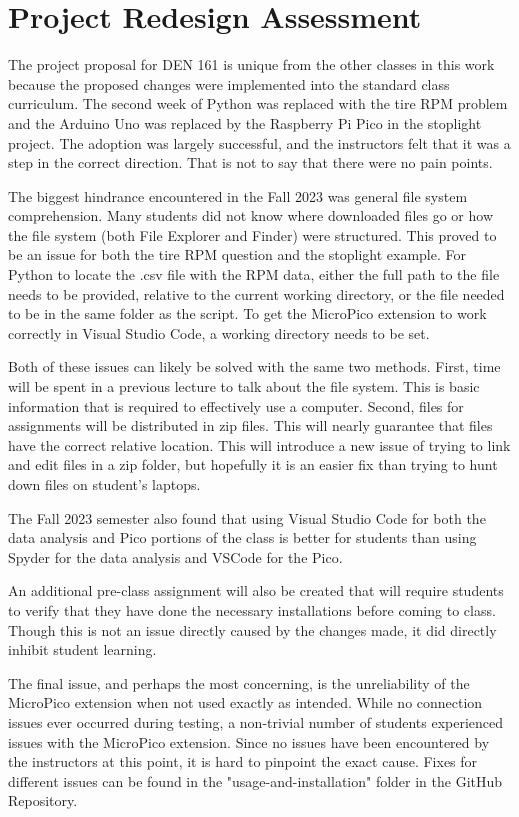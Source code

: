 \section{Project Redesign Assessment}

The project proposal for DEN 161 is unique from the other classes in this work because the proposed changes were
implemented into the standard class curriculum. The second week of Python was replaced with the tire RPM problem
and the Arduino Uno was replaced by the Raspberry Pi Pico in the stoplight project. The adoption was largely 
successful, and the instructors felt that it was a step in the correct direction. That is not to say that there
were no pain points.

The biggest hindrance encountered in the Fall 2023 was general file system comprehension. Many students did not 
know where downloaded files go or how the file system (both File Explorer and Finder) were structured. This proved 
to be an issue for both the tire RPM question and the stoplight example. For Python to locate the .csv file 
with the RPM data, either the full path to the file needs to be provided, relative to the current working directory,
or the file needed to be in the same folder as the script. To get the MicroPico extension to work correctly in
Visual Studio Code, a working directory needs to be set. 

Both of these issues can likely be solved with the same two methods. First, time will be spent in a previous lecture
to talk about the file system. This is basic information that is required to effectively use a computer. Second,
files for assignments will be distributed in zip files. This will nearly guarantee that files have the correct
relative location. This will introduce a new issue of trying to link and edit files in a zip folder, but hopefully
it is an easier fix than trying to hunt down files on student's laptops.

The Fall 2023 semester also found that using Visual Studio Code for both the data analysis and Pico portions of the
class is better for students than using Spyder for the data analysis and VSCode for the Pico. 

An additional pre-class assignment will also be created that will require students to verify that they have
done the necessary installations before coming to class. Though this is not an issue directly caused by the changes
made, it did directly inhibit student learning.

The final issue, and perhaps the most concerning, is the unreliability of the MicroPico extension when not used 
exactly as intended. While no connection issues ever occurred during testing, a non-trivial number of students
experienced issues with the MicroPico extension. Since no issues have been encountered by the instructors at this
point, it is hard to pinpoint the exact cause. Fixes for different issues can be found in the 
"usage-and-installation" folder in the GitHub Repository.

